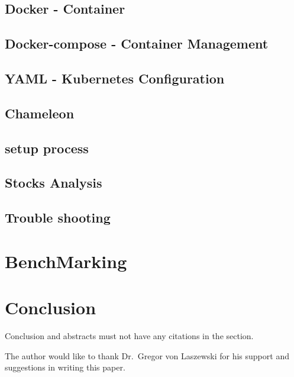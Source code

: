 \subsection{Docker - Container}
\subsection{Docker-compose - Container Management}
\subsection{YAML - Kubernetes Configuration}



\subsection{Chameleon}
\subsection{setup process}


\subsection{Stocks Analysis}


\subsection{Trouble shooting}


\section{BenchMarking}



\section{Conclusion}

 Conclusion and abstracts must not have any
citations in the section.


\begin{acks}
The author would like to thank Dr.\ Gregor von Laszewski for his support and
suggestions in writing this paper.
\end{acks}






